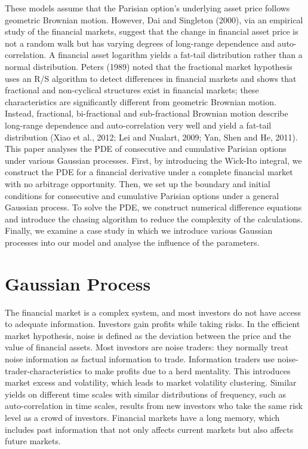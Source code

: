 \documentclass[preprint,12pt]{elsarticle}
\begin{document}
These models assume that the Parisian option’s underlying asset price follows geometric Brownian motion. However, Dai and Singleton (2000), via an empirical study of the financial markets, suggest that the change in financial asset price is not a random walk but has varying degrees of long-range dependence and auto-correlation. A financial asset logarithm yields a fat-tail distribution rather than a normal distribution. Peters (1989) noted that the fractional market hypothesis uses an R/S algorithm to detect differences in financial markets and shows that fractional and non-cyclical structures exist in financial markets; these characteristics are significantly different from geometric Brownian motion. Instead, fractional, bi-fractional and sub-fractional Brownian motion describe long-range dependence and auto-correlation very well and yield a fat-tail distribution (Xiao et al., 2012; Lei and Nualart, 2009; Yan, Shen and He, 2011). \\

This paper analyses the PDE of consecutive and cumulative Parisian options under various Gaussian processes. First, by introducing the Wick-Ito integral, we construct the PDE for a financial derivative under a complete financial market with no arbitrage opportunity. Then, we set up the boundary and initial conditions for consecutive and cumulative Parisian options under a general Gaussian process. To solve the PDE, we construct numerical difference equations and introduce the chasing algorithm to reduce the complexity of the calculations. Finally, we examine a case study in which we introduce various Gaussian processes into our model and analyse the influence of the parameters.


\section{Gaussian Process}
The financial market is a complex system, and most investors do not have access to adequate information. Investors gain profits while taking risks. In the efficient market hypothesis, noise is defined as the deviation between the price and the value of financial assets. Most investors are noise traders: they normally treat noise information as factual information to trade. Information traders use noise-trader-characteristics to make profits due to a herd mentality. This introduces market excess and volatility, which leads to market volatility clustering. Similar yields on different time scales with similar distributions of frequency, such as auto-correlation in time scales, results from new investors who take the same risk level as a crowd of investors. Financial markets have a long memory, which includes past information that not only affects current markets but also affects future markets.
\end{document}
